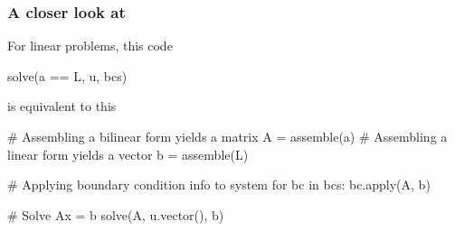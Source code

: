 \begin{frame}[fragile]
  \frametitle{A closer look at }

  For linear problems, this code
  \vspace{-1em}
  \begin{python}
solve(a == L, u, bcs)
  \end{python}
  is equivalent to this
  \vspace{-1em}
  \begin{python}
# Assembling a bilinear form yields a matrix
A = assemble(a)
# Assembling a linear form yields a vector
b = assemble(L)

# Applying boundary condition info to system
for bc in bcs:
    bc.apply(A, b)

# Solve Ax = b
solve(A, u.vector(), b)
  \end{python}

\end{frame}
